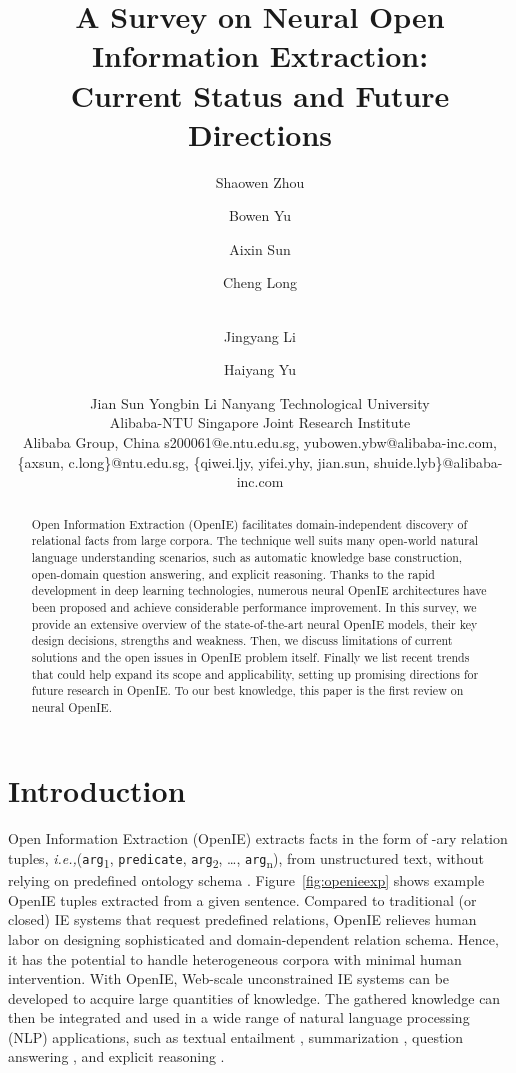 \documentclass{article}
\title{A Survey on Neural Open Information Extraction:\\ Current Status and Future Directions}
\author{
Shaowen Zhou
\and
Bowen Yu\and
Aixin Sun\and
Cheng Long\and\\
Jingyang Li\and
Haiyang Yu\and
Jian Sun\And
Yongbin Li
\affiliations
Nanyang Technological University\\
Alibaba-NTU Singapore Joint Research Institute\\
Alibaba Group, China
\emails
s200061@e.ntu.edu.sg,
yubowen.ybw@alibaba-inc.com,\\
\{axsun, c.long\}@ntu.edu.sg,
\{qiwei.ljy, yifei.yhy, jian.sun, shuide.lyb\}@alibaba-inc.com
}
\newcommand{\ie}{\emph{i.e.,}\xspace}
\begin{document}
\maketitle

\begin{abstract}
Open Information Extraction (OpenIE) facilitates domain-independent discovery of relational facts from large corpora. The technique well suits many open-world natural language understanding scenarios, such as automatic knowledge base construction, open-domain question answering, and explicit reasoning. 
Thanks to the rapid development in deep learning technologies, numerous neural OpenIE architectures have been proposed and achieve considerable performance improvement.
In this survey, we provide an extensive overview of the state-of-the-art neural OpenIE models,  their key design decisions, strengths and weakness. 
Then, we discuss limitations of current solutions and the open issues in OpenIE problem itself. Finally we list recent trends that could help expand its scope and applicability, setting up promising directions for future research in OpenIE. To our best knowledge, this paper is the first review on neural OpenIE.
\end{abstract}

\section{Introduction}
\label{sec:intro}
Open Information Extraction (OpenIE) extracts facts in the form of -ary relation tuples, \ie (\verb|arg|\textsubscript{1}, \verb|predicate|, \verb|arg|\textsubscript{2}, \ldots, \verb|arg|\textsubscript{n}), from unstructured text, without relying on predefined ontology schema \cite{niklaus-etal-2018-survey}.
Figure~\ref{fig:openieexp} shows example OpenIE tuples extracted from a given sentence. 
Compared to traditional (or closed) IE systems that request predefined relations, OpenIE relieves human labor on designing sophisticated and domain-dependent relation schema. Hence, it has the potential to handle heterogeneous corpora with minimal human intervention. 
With OpenIE, Web-scale unconstrained IE systems can be developed to acquire large quantities of knowledge.
The gathered knowledge can then be integrated and used in a wide range of natural language processing (NLP) applications, such as textual entailment \cite{berant-etal-2011-global}, summarization \cite{stanovsky-etal-2015-open}, question answering \cite{fader2014open,Mausam2016openie4}, and explicit reasoning \cite{fu-etal-2019-collaborative}.
\end{document}
